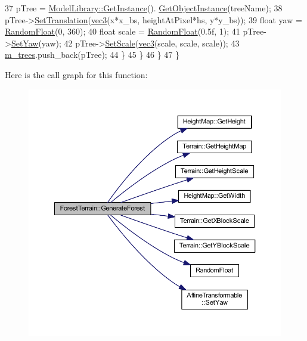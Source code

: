 \begin{DoxyCode}
37         pTree = \hyperlink{class_singleton_a74f32751d99bf3cc95fe17aba11f4b07}{ModelLibrary::GetInstance}().
      \hyperlink{class_model_library_a1e9987808a135340d5b321f5b79c573f}{GetObjectInstance}(treeName);
38         pTree->\hyperlink{class_affine_transformable_abd554f0c81205675ed2a6520e09e5b98}{SetTranslation}(\hyperlink{_types_8h_a3d0ce73e3199de81565fb01632415288}{vec3}(x*x\_bs, heightAtPixel*hs, y*y\_bs));
39         \textcolor{keywordtype}{float} yaw = \hyperlink{_random_8h_a9f58d4bd6816fa021e202738ae24020f}{RandomFloat}(0, 360);
40         \textcolor{keywordtype}{float} scale = \hyperlink{_random_8h_a9f58d4bd6816fa021e202738ae24020f}{RandomFloat}(0.5f, 1);
41         pTree->\hyperlink{class_affine_transformable_a47ab5b07df1ee77ae2e63dc0804c5caa}{SetYaw}(yaw);
42         pTree->\hyperlink{class_affine_transformable_a215383be79781d61103dfdf8c201be22}{SetScale}(\hyperlink{_types_8h_a3d0ce73e3199de81565fb01632415288}{vec3}(scale, scale, scale));
43         \hyperlink{class_forest_terrain_a4e5d3e48f4b6169c7feda855d3b104b2}{m\_trees}.push\_back(pTree);
44       \}
45     \}
46   \}
47 \}
\end{DoxyCode}


Here is the call graph for this function\+:
\nopagebreak
\begin{figure}[H]
\begin{center}
\leavevmode
\includegraphics[width=350pt]{class_forest_terrain_a00b38761747044c6b5b786082671548e_cgraph}
\end{center}
\end{figure}





